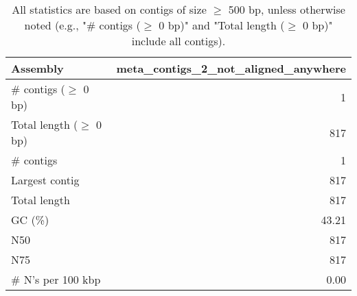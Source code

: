 \documentclass[12pt,a4paper]{article}
\begin{document}
\begin{table}[ht]
\begin{center}
\caption{All statistics are based on contigs of size $\geq$ 500 bp, unless otherwise noted (e.g., "\# contigs ($\geq$ 0 bp)" and "Total length ($\geq$ 0 bp)" include all contigs).}
\begin{tabular}{|l*{1}{|r}|}
\hline
Assembly & meta\_contigs\_2\_not\_aligned\_anywhere \\ \hline
\# contigs ($\geq$ 0 bp) & 1 \\ \hline
Total length ($\geq$ 0 bp) & 817 \\ \hline
\# contigs & 1 \\ \hline
Largest contig & 817 \\ \hline
Total length & 817 \\ \hline
GC (\%) & 43.21 \\ \hline
N50 & 817 \\ \hline
N75 & 817 \\ \hline
\# N's per 100 kbp & 0.00 \\ \hline
\end{tabular}
\end{center}
\end{table}
\end{document}
